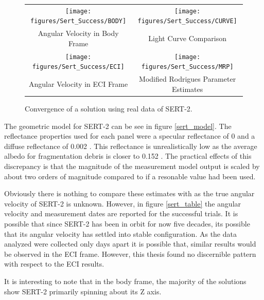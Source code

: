 \begin{figure}
	\begin{tabular}{cc}
		\texttt{[image: figures/Sert\_Success/BODY]} &
		\texttt{[image: figures/Sert\_Success/CURVE]} \\
		Angular Velocity in Body Frame & Light Curve Comparison \\
		\texttt{[image: figures/Sert\_Success/ECI]} &
		\texttt{[image: figures/Sert\_Success/MRP]} \\
		Angular Velocity in ECI Frame & Modified Rodrigues Parameter Estimates
	\end{tabular}
	\caption{Convergence of a solution using real data of SERT-2.}
\end{figure}

The geometric model for SERT-2 can be see in figure \ref{sert_model}. The reflectance properties used for each panel were a specular reflectance of 0 and a diffuse reflectance of 0.002 . This reflectance is unrealistically low as the average albedo for fragmentation debris is closer to 0.152 \cite{global_albedo}. The practical effects of this discrepancy is that the magnitude of the measurement model output is scaled by about two orders of magnitude compared to if a resonable value had been used.

Obviously there is nothing to compare these estimates with as the true angular velocity of SERT-2 is unknown. However, in figure \ref{sert_table} the angular velocity and measurement dates are reported for the successful trials. It is possible that since SERT-2 has been in orbit for now five decades, its possible that its angular velocity has settled into stable configuration. As the data analyzed were collected only days apart it is possible that, similar results would be observed in the ECI frame. However, this thesis found no discernible pattern with respect to the ECI results.

It is interesting to note that in the body frame, the majority of the solutions show SERT-2 primarily spinning about its Z axis.

